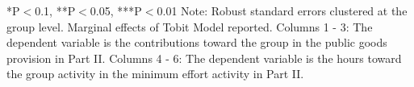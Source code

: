 \begin{table}[htbp]
\begin{tabular}{c c c c c c c}
\end{tabular}

\begin{footnotesize}
\newline
*P$<$0.1, **P$<$0.05, ***P$<$0.01
\newline
Note: Robust standard errors clustered at the group level. Marginal effects of Tobit Model reported.
\newline
Columns 1 - 3: The dependent variable is the contributions toward the group in the public goods provision in Part II. 
\newline
Columns 4 - 6: The dependent variable is the hours toward the group activity in the minimum effort activity in Part II. 
\end{footnotesize}
\end{table}